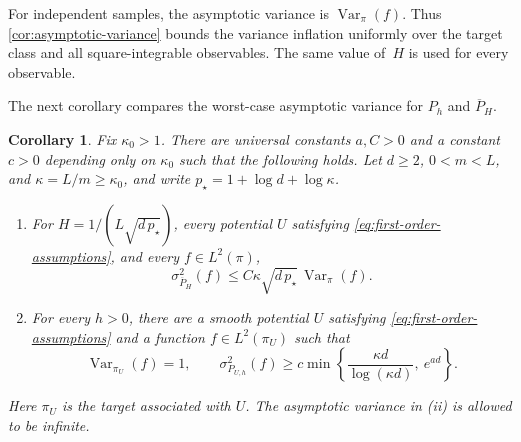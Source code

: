 \documentclass[11pt]{article}
\newtheorem{corollary}[corollary]{Corollary}
\newcommand{\Var}{\operatorname{Var}}
\newcommand{\1}{\mathbf 1}
\begin{document}
	
	For independent samples, the asymptotic variance is $\Var_\pi(f)$.
	Thus \cref{cor:asymptotic-variance} bounds the variance inflation
	uniformly over the target class and all square-integrable observables.
	The same value of~$H$ is used for every observable. 
	
	
	
	The next corollary compares the worst-case asymptotic variance for $P_h$ and $\overline P_H$.
	
	
	\begin{corollary}\label{cor:variance-separation}
		Fix $\kappa_0>1$. There are universal constants $a,C>0$ and a
		constant $c>0$ depending only on $\kappa_0$ such that the following
		holds. Let $d\geq2$, $0<m<L$, and $\kappa=L/m\geq\kappa_0$, and
		write $p_\star=1+\log d+\log\kappa$.
		\begin{enumerate}[label=(\roman*)]
			\item For $H=1/(L\sqrt{d\,p_\star})$, every potential $U$ satisfying
			\eqref{eq:first-order-assumptions}, and every $f\in L^2(\pi)$,
			\[
			\sigma_{\overline P_H}^2(f)
			\leq C\kappa\sqrt{d\,p_\star}\,\Var_\pi(f).
			\]
			
			\item For every $h>0$, there are a smooth potential $U$ satisfying
			\eqref{eq:first-order-assumptions} and a function $f\in L^2(\pi_U)$
			such that
			\[
			\Var_{\pi_U}(f)=1,
			\qquad
			\sigma_{P_{U,h}}^2(f)
			\geq c\min\left\{
			\frac{\kappa d}{\log(\kappa d)},\ e^{ad}
			\right\}.
			\]
		\end{enumerate}
		Here $\pi_U$ is the target associated with $U$. The asymptotic
		variance in (ii) is allowed to be infinite.
	\end{corollary}
	
\end{document}

